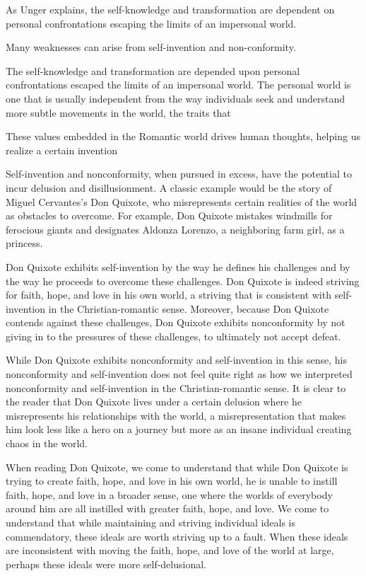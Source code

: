 \documentclass[12pt,letterpaper]{article}
\begin{document}
As Unger explains, the self-knowledge and transformation are dependent on personal confrontations escaping the limits of an impersonal world.

Many weaknesses can arise from self-invention and non-conformity.

The self-knowledge and transformation are depended upon personal confrontations escaped the limits of an impersonal world.  The personal world is one that is usually independent from the way individuals seek and understand more subtle movements in the world, the traits that 


These values embedded in the Romantic world drives human thoughts, helping us realize a certain invention

\fi

Self-invention and nonconformity, when pursued in excess, have the potential to incur delusion and disillusionment.  A classic example would be the story of Miguel Cervantes's Don Quixote, who misrepresents certain realities of the world as obstacles to overcome.  For example, Don Quixote mistakes windmills for ferocious giants and designates Aldonza Lorenzo, a neighboring farm girl, as a princess.  

Don Quixote exhibits self-invention by the way he defines his challenges and by the way he proceeds to overcome these challenges.  Don Quixote is indeed striving for faith, hope, and love in his own world, a striving that is consistent with self-invention in the Christian-romantic sense.  Moreover, because Don Quixote contends against these challenges, Don Quixote exhibits nonconformity by not giving in to the pressures of these challenges, to ultimately not accept defeat.

While Don Quixote exhibits nonconformity and self-invention in this sense, his nonconformity and self-invention does not feel quite right as how we interpreted nonconformity and self-invention in the Christian-romantic sense.  It is clear to the reader that Don Quixote lives under a certain delusion where he misrepresents his relationships with the world, a misrepresentation that makes him look less like a hero on a journey but more as an insane individual creating chaos in the world.

When reading Don Quixote, we come to understand that while Don Quixote is trying to create faith, hope, and love in his own world, he is unable to instill faith, hope, and love in a broader sense, one where the worlds of everybody around him are all instilled with greater faith, hope, and love.  We come to understand that while maintaining and striving individual ideals is commendatory, these ideals are worth striving up to a fault.  When these ideals are inconsistent with moving the faith, hope, and love of the world at large, perhaps these ideals were more self-delusional.
\end{document}
